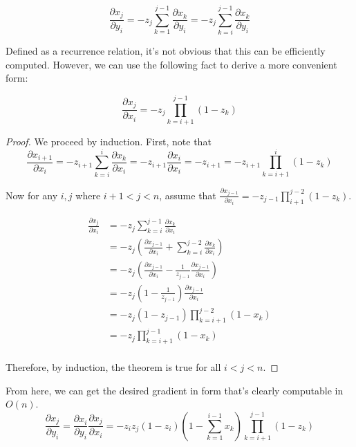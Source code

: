 \documentclass{article}
\begin{document}
$$\frac{\partial x_j}{\partial y_i} =  - z_j \sum_{k=1}^{j-1}
\frac{\partial x_k}{\partial y_i} =
-z_j \sum_{k=i}^{j-1}
\frac{\partial x_k}{\partial y_i}
$$

Defined as a recurrence relation, it's not obvious that this can be efficiently
computed. However, we can use the following fact to derive a more convenient
form:

\begin{equation}
\frac{\partial x_j}{\partial x_i} = -z_j \prod_{k=i+1}^{j-1} (1 - z_k)
\end{equation}

\begin{proof}
We proceed by induction. First, note that $$
\frac{\partial x_{i+1}}{\partial x_i}
= -z_{i+1} \sum_{k=i}^{i}\frac{\partial x_k}{\partial x_i}
= -z_{i+1} \frac{\partial{x_i}}{\partial x_i}
= -z_{i+1}
= -z_{i+1} \prod_{k=i+1}^{i} (1 - z_k)
$$

Now for any $i, j$ where $i + 1 < j < n$, assume that $\frac{\partial
x_{j-1}}{\partial x_i} =
-z_{j-1} \prod_{i+1}^{j-2} (1 - z_k)$.

\begin{align*}
\frac{\partial x_j}{\partial x_i} &= -z_j \sum_{k=i}^{j-1} \frac{\partial
x_k}{\partial x_i} \\
&= -z_j \left( \frac{\partial x_{j-1}}{\partial x_i} + \sum_{k=i}^{j-2} \frac{\partial
x_k}{\partial x_i} \right) \\
&= -z_j \left( \frac{\partial x_{j-1}}{\partial x_i} - \frac{1}{z_{j-1}} \frac{\partial
x_{j-1}}{\partial x_i} \right) \\
&= -z_j \left( 1 - \frac{1}{z_{j-1}} \right) \frac{\partial x_{j-1}}{\partial
x_i} \\
&= -z_j ( 1 - z_{j-1} ) \prod_{k=i+1}^{j-2} (1-x_k) \\
&= -z_j \prod_{k=i+1}^{j-1} (1-x_k) \\
\end{align*}

Therefore, by induction, the theorem is true for all $i < j < n$.

\end{proof}

From here, we can get the desired gradient in form that's clearly computable in
$O(n)$.
\begin{equation} \label{eq:1}
\frac{\partial x_j}{\partial y_i}
= \frac{\partial x_i}{\partial y_i} \frac{\partial x_j}{\partial x_i}
= - z_i z_j (1 - z_i) \left(1 - \sum_{k=1}^{i-1} x_k \right) \prod_{k=i+1}^{j-1} (1 - z_k)
\end{equation}
\end{document}
